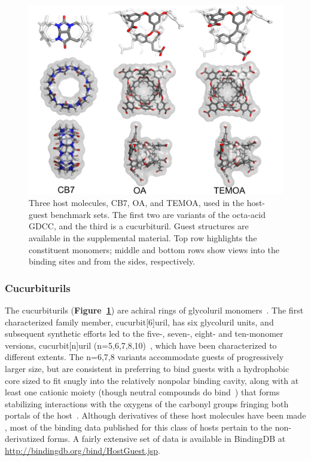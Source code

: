 \documentclass[aps,pre,twocolumn,nofootinbib,superscriptaddress,10pt, final,tightenlines]{revtex4-1}
\begin{document}
\begin{figure}
\includegraphics[width=\textwidth]{figures/hosts.pdf}
\caption{\label{hosts}
Three host molecules, CB7, OA, and TEMOA, used in the host-guest benchmark sets.
The first two are variants of the octa-acid GDCC, and the third is a cucurbituril.
Guest structures are available in the supplemental material.
Top row highlights the constituent monomers; middle and bottom rows show views into the binding sites and from the sides, respectively.
}
\end{figure}

\subsubsection{Cucurbiturils}
\label{sec:cb}
The cucurbiturils ({\bf Figure~\ref{hosts}}) are achiral rings of glycoluril monomers~\cite{freeman_cucurbituril_1981}. The first characterized family member, cucurbit[6]uril, has six glycoluril units, and subsequent synthetic efforts led to the five-, seven-, eight- and ten-monomer versions, cucurbit[n]uril (n=5,6,7,8,10)~\cite{liu_cucurbituril_2005},
which have been characterized to different extents. 
The n=6,7,8 variants accommodate guests of progressively larger size, but are consistent in preferring to bind guests with a hydrophobic core sized to fit snugly into the relatively nonpolar binding cavity, along with at least one cationic moiety (though neutral compounds do bind~\cite{wyman_cucurbituril_2008, lee_deciphering_2015}) that forms stabilizing interactions with the oxygens of the carbonyl groups fringing both portals of the host~\cite{liu_cucurbituril_2005}. 
Although derivatives of these host molecules have been made \cite{Lee:2003:AccountsofChemicalResearch, vinciguerra_synthesis_2015, assaf_cucurbiturils:_2015, Cong:2016:Org.Biomol.Chem.},
most of the binding data published for this class of hosts pertain to the non-derivatized forms. 
A fairly extensive set of data is available in BindingDB at \url{http://bindingdb.org/bind/HostGuest.jsp}.
\end{document}
